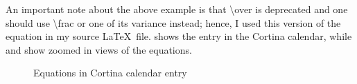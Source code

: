 An important note about the above example is that \textbackslash over is deprecated and one should use \textbackslash frac{}{} or one of its variance instead; hence, I used this version of the equation in my source \LaTeX~file.
\clearpage
{} shows the entry in the Cortina calendar, while  and  show zoomed in views of the equations.
\begin{figure}[!ht]
  \begin{center}
  \end{center}
  \caption{Equations in Cortina calendar entry}
  \label{fig:cortinaExample1}
\end{figure}
\FloatBarrier

